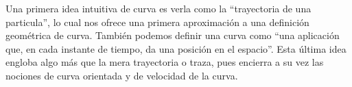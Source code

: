 Una primera idea intuitiva de curva es verla como la “trayectoria de una particula”, lo cual nos ofrece una primera aproximación a una definición geométrica de curva. También podemos definir una curva como “una aplicación que, en cada instante de tiempo, da una posición en el espacio”. Esta última idea engloba algo más que la mera trayectoria o traza, pues encierra a su vez las nociones de curva orientada y de velocidad de la curva.
\begin{example}{}
  
\end{example}
